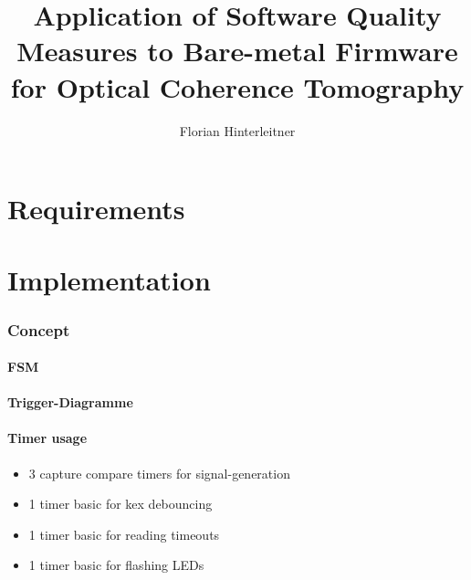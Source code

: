 \documentclass[master,english,smartquotes,apa]{hgbthesis}
\title{ Application of Software Quality Measures to Bare-metal Firmware for Optical Coherence Tomography}
\author{Florian Hinterleitner}
\newcommand{\TODO}[1]{\textcolor{red}{\textbf{ToDo:} #1}}
\begin{document}
\frontmatter                                   %
\maketitle

\tableofcontents

		
			

\mainmatter                                    %




% 

	
	\chapter{Requirements}
	\label{cha:Requirements}

	\chapter{Implementation}
	\label{cha:Implementation}
		\subsection{Concept}
		\subsubsection{FSM}
		\subsubsection{Trigger-Diagramme}
		\subsubsection{Timer usage}
			\begin{itemize} \setlength\itemsep{1px}
			\item 3 capture compare timers for signal-generation
			\item 1 timer basic for kex debouncing 
			\item 1 timer basic for reading timeouts
			\item 1 timer basic for flashing LEDs
			\end{itemize}
\end{document}
